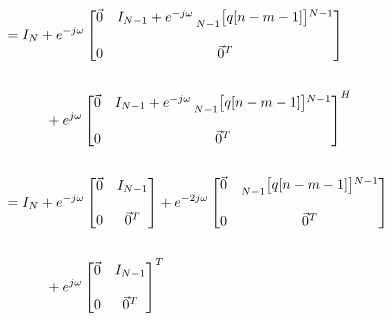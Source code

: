 \documentclass{article}
\begin{document}
\begin{align*}
    &= I_{N} + e^{-j\omega}\begin{bmatrix}
                                \vec{0} & I_{N - 1} + e^{-j\omega}\prescript{}{N - 1}{\begin{bmatrix} q[n - m - 1] \end{bmatrix}}^{N - 1} \\ \\
                                     0  & \vec{0}^{T}
                             \end{bmatrix} \\ \\
    &\quad \quad \quad + e^{ j\omega}\begin{bmatrix}
                                            \vec{0} & I_{N - 1} + e^{-j\omega}\prescript{}{N - 1}{\begin{bmatrix} q[n - m - 1] \end{bmatrix}}^{N - 1} \\ \\
                                                 0  & \vec{0}^{T}
                                       \end{bmatrix}^{H} \\ \\
    &= I_{N} + e^{-j\omega}\begin{bmatrix}
                                \vec{0} & I_{N - 1} \\ \\
                                     0  & \vec{0}^{T}
                             \end{bmatrix} +
              e^{-2j\omega}\begin{bmatrix}
                                \vec{0} & \prescript{}{N - 1}{\begin{bmatrix} q[n - m - 1] \end{bmatrix}}^{N - 1} \\ \\
                                     0  & \vec{0}^{T}
                             \end{bmatrix} \\ \\
    &\quad \quad \quad + e^{j\omega}\begin{bmatrix}
                                           \vec{0} & I_{N - 1} \\ \\
                                                0  & \vec{0}^{T}
                                      \end{bmatrix}^{T} 

\end{align*}
\end{document}

